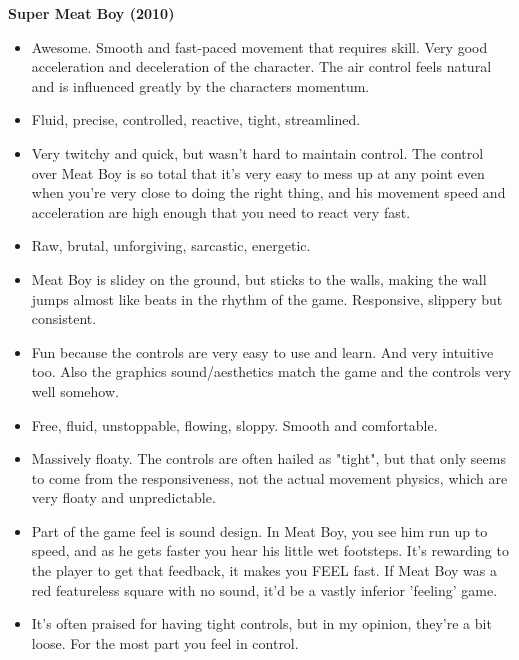 \textbf{Super Meat Boy (2010)}
\vspace{-5mm}
\begin{itemize}[noitemsep,nolistsep]
\item Awesome. Smooth and fast-paced movement that requires skill. Very good acceleration and deceleration of the character. The air control feels natural and is influenced greatly by the characters momentum. 
\item Fluid, precise, controlled, reactive, tight, streamlined.
\item Very twitchy and quick, but wasn't hard to maintain control. The control over Meat Boy is so total that it's very easy to mess up at any point even when you're very close to doing the right thing, and his movement speed and acceleration are high enough that you need to react very fast.
\item Raw, brutal, unforgiving, sarcastic, energetic.
\item Meat Boy is slidey on the ground, but sticks to the walls, making the wall jumps almost like beats in the rhythm of the game. Responsive, slippery but consistent.
\item Fun because the controls are very easy to use and learn. And very intuitive too. Also the graphics sound/aesthetics match the game and the controls very well somehow.
\item Free, fluid, unstoppable, flowing, sloppy. Smooth and comfortable.
\item Massively floaty. The controls are often hailed as "tight", but that only seems to come from the responsiveness, not the actual movement physics, which are very floaty and unpredictable.
\item Part of the game feel is sound design. In Meat Boy, you see him run up to speed, and as he gets faster you hear his little wet footsteps. It's rewarding to the player to get that feedback, it makes you FEEL fast. If Meat Boy was a red featureless square with no sound, it'd be a vastly inferior 'feeling' game.
\item It's often praised for having tight controls, but in my opinion, they're a bit loose. For the most part you feel in control.
\end{itemize}


